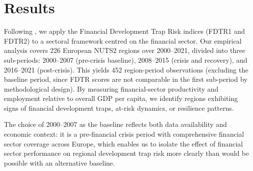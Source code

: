 \documentclass[a4paper,11pt,oneside]{article}
\newcommand{\Emili}{\color{emili}}
\begin{document}


\section{Results}
\label{sec:results}


Following \cite{diemer2022regional}, we apply the Financial Development Trap Risk indices (FDTR1 and FDTR2) to a sectoral framework centred on the financial sector. Our empirical analysis covers 226 European NUTS2 regions over 2000--2021, divided into three sub-periods: 2000--2007 (pre-crisis baseline), 2008--2015 (crisis and recovery), and 2016--2021 (post-crisis). This yields 452 region-period observations (excluding the baseline period, since FDTR scores are not comparable in the first sub-period by methodological design). By measuring financial-sector productivity and employment relative to overall GDP per capita, we identify regions exhibiting signs of financial development traps, at-risk dynamics, or resilience patterns. 

The choice of 2000--2007 as the baseline reflects both data availability and economic context: it is a pre-financial crisis period with comprehensive financial sector coverage across Europe, which enables us to isolate the effect of financial sector performance on regional development trap risk more clearly than would be possible with an alternative baseline.





\end{document}
